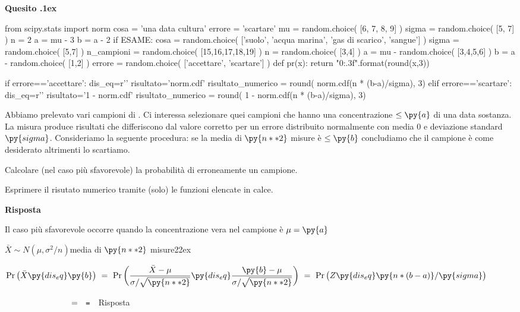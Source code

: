 \documentclass[11pt,twoside,a4paper]{article}
\def\Pr{{\rm Pr\,}}
\newcounter{quesito}
\newenvironment{question}{\addtocounter{quesito}{1}\bigskip\bigskip\par\textbf{Quesito \thequesito.\kern1ex}}{\vspace{\parskip}}
\newenvironment{answer}{\par\textbf{Risposta\quad}}{\vspace{\parskip}}
\begin{document}
\clearpage
\begin{question} 
\begin{pycode}
from scipy.stats import norm
cosa = 'una data cultura'
errore = 'scartare'
mu    = random.choice( [6, 7, 8, 9] )
sigma = random.choice( [5, 7] )
n = 2
a = mu - 3 
b = a - 2
if ESAME:
    cosa = random.choice( ['suolo', 'acqua marina', 'gas di scarico', 'sangue'] )
    sigma = random.choice( [5,7] )
    n_campioni = random.choice( [15,16,17,18,19] )
    n = random.choice( [3,4] )
    a = mu - random.choice( [3,4,5,6] )
    b = a - random.choice( [1,2] )
    errore =  random.choice( ['accettare', 'scartare'] )
def pr(x):
    return "{0:.3f}".format(round(x,3))

if errore=='accettare':
    dis_eq=r'\le'
    risultato='norm.cdf'
    risultato_numerico = round( norm.cdf(n * (b-a)/sigma), 3)
elif errore=='scartare':
    dis_eq=r'\ge'
    risultato='1 - norm.cdf'
    risultato_numerico = round( 1 -  norm.cdf(n * (b-a)/sigma), 3)
    
\end{pycode}
Abbiamo prelevato vari campioni di . Ci interessa selezionare quei campioni che hanno una concentrazione $\le\py{a}$ di una data sostanza. La misura produce risultati che differiscono dal valore corretto per un errore distribuito normalmente con media $0$ e deviazione standard $\py{sigma}$. Consideriamo la seguente procedura: se la media di $\py{n**2}$ misure è $\le\py{b}$ concludiamo che il campione è come desiderato altrimenti lo scartiamo.

Calcolare (nel caso più sfavorevole) la probabilità di  erroneamente un campione.

Esprimere il risutato numerico tramite (solo) le funzioni elencate in calce.
\begin{answer}

Il caso più sfavorevole occorre quando la concentrazione vera nel campione è $\mu=\py{a}$ 


$\bar X\sim N(\mu,\sigma^2/n)$\hfill media di $\py{n**2}$ misure\kern22ex

$\displaystyle\Pr\big(\bar X\py{dis_eq}\py{b}\big)\ =\ \Pr\bigg(\frac{\bar X-\mu}{\sigma/\sqrt{\py{n**2}}}\py{dis_eq}\frac{\py{b}-\mu}{\sigma/\sqrt{\py{n**2}}}\bigg)\ =\  \Pr\big(Z\py{dis_eq}\py{n * (b-a) } /\py{sigma} \big)$

$\phantom{\Pr\big(\bar X\le\py{b}\big)}\ =\ ${}{\tt\ =\  }\hfill {\color{blue}\hfill Risposta}

\end{answer}
\end{question}
\end{document}

